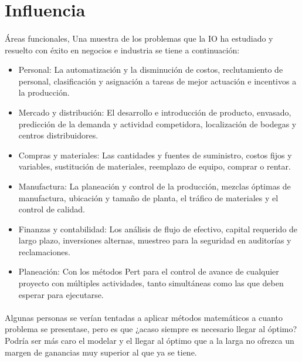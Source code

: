 \documentclass[12pt, a4paper,spanish]{article}
\begin{document}
	\section{Influencia}
		\paragraph{}
		Áreas funcionales, Una muestra de los problemas que la IO ha estudiado y resuelto con éxito en negocios e industria se tiene a continuación:

		\begin{itemize}

			\item Personal: La automatización y la disminución de costos, reclutamiento de personal, clasificación y asignación a tareas de mejor actuación e incentivos a la producción.\cite{wikipedia_IO}

			\item Mercado y distribución: El desarrollo e introducción de producto, envasado, predicción de la demanda y actividad competidora, localización de bodegas y centros distribuidores.\cite{wikipedia_IO}

			\item Compras y materiales: Las cantidades y fuentes de suministro, costos fijos y variables, sustitución de materiales, reemplazo de equipo, comprar o rentar.\cite{wikipedia_IO}

			\item Manufactura: La planeación y control de la producción, mezclas óptimas de manufactura, ubicación y tamaño de planta, el tráfico de materiales y el control de calidad.\cite{wikipedia_IO}

			\item Finanzas y contabilidad: Los análisis de flujo de efectivo, capital requerido de largo plazo, inversiones alternas, muestreo para la seguridad en auditorías y reclamaciones.\cite{wikipedia_IO}

			\item Planeación: Con los métodos Pert para el control de avance de cualquier proyecto con múltiples actividades, tanto simultáneas como las que deben esperar para ejecutarse.\cite{wikipedia_IO}

		\end{itemize}

		\paragraph{}
		Algunas personas se verían tentadas a aplicar métodos matemáticos a cuanto problema se presentase, pero es que ¿acaso siempre es necesario llegar al óptimo? Podría ser más caro el modelar y el llegar al óptimo que a la larga no ofrezca un margen de ganancias muy superior al que ya se tiene.\cite{wikipedia_IO}
\end{document}
